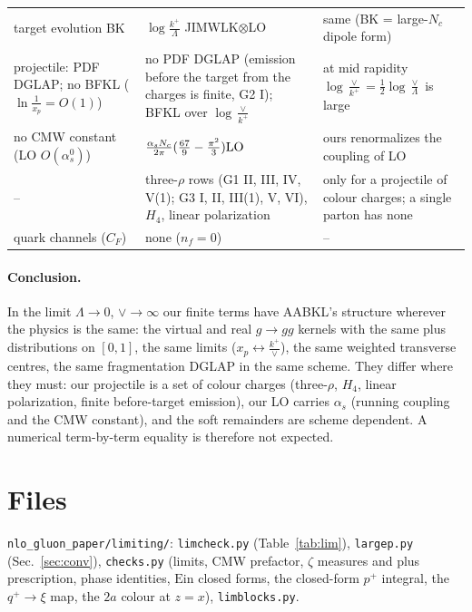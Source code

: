 \documentclass[10pt]{article}
\numberwithin{equation}{section}
\newcommand{\LO}{{\rm LO}}
\newcommand{\Ein}{\mathrm{Ein}}
\begin{document}
{\begin{longtable}{@{}>{\raggedright\arraybackslash}p{}>{\raggedright\arraybackslash}p{}>{\raggedright\arraybackslash}p{}@{}}
target evolution BK & $\log\frac{k^+}{\Lambda}$ JIMWLK$\otimes$LO & same (BK = large-$N_c$ dipole form)\\
projectile: PDF DGLAP; no BFKL ($\ln\frac1{x_p}=O(1)$) & no PDF DGLAP (emission before the target from the charges is finite, G2 I); BFKL over $\log\frac{\vee}{k^+}$ & at mid rapidity $\log\frac\vee{k^+}=\frac12\log\frac\vee\Lambda$ is large\\
no CMW constant (LO $O(\alpha_s^0)$) & $\frac{\alpha_sN_c}{2\pi}(\frac{67}{9}-\frac{\pi^2}{3})\LO$ & ours renormalizes the coupling of LO\\
-- & three-$\rho$ rows (G1 II, III, IV, V(1); G3 I, II, III(1), V, VI), $H_4$, linear polarization & only for a projectile of colour charges; a single parton has none\\
quark channels ($C_F$) & none ($n_f=0$) & --\\\bottomrule
\end{longtable}}
\paragraph{Conclusion.} In the limit $\Lambda\to0$, $\vee\to\infty$ our finite terms have AABKL's structure wherever the physics is the same: the virtual and real $g\to gg$ kernels with the same plus distributions on $[0,1]$, the same limits ($x_p\leftrightarrow\frac{k^+}{\vee}$), the same weighted transverse centres, the same fragmentation DGLAP in the same scheme. They differ where they must: our projectile is a set of colour charges (three-$\rho$, $H_4$, linear polarization, finite before-target emission), our LO carries $\alpha_s$ (running coupling and the CMW constant), and the soft remainders are scheme dependent. A numerical term-by-term equality is therefore not expected.

\section{Files}
\texttt{nlo\_gluon\_paper/limiting/}: \texttt{limcheck.py} (Table~\ref{tab:lim}), \texttt{largep.py} (Sec.~\ref{sec:conv}), \texttt{checks.py} (limits, CMW prefactor, $\zeta$ measures and plus prescription, phase identities, $\Ein$ closed forms, the closed-form $p^+$ integral, the $q^+\to\xi$ map, the $2a$ colour at $z=x$), \texttt{limblocks.py}.
\end{document}
